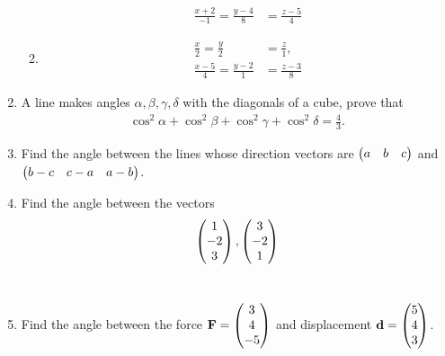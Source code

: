 \documentclass[journal,12pt,twocolumn]{IEEEtran}
\renewcommand\thesection{\arabic{section}}
\begin{document}
\begin{enumerate}[label=\thesection.\arabic*.,ref=\thesection.\theenumi]
\begin{enumerate}
\begin{align}
\frac{x+2}{-1} = \frac{y-4}{8} &= \frac{z-5}{4} 
\end{align}
\item 
\begin{align}
\frac{x}{2} = \frac{y}{2} &= \frac{z}{1}, 
\\
\frac{x-5}{4} = \frac{y-2}{1} &= \frac{z-3}{8} 
\end{align}
\end{enumerate}
\solution
%
\item A line makes angles $\alpha, \beta, \gamma, \delta$ with the diagonals of a cube, prove that \begin{align}
\cos^2\alpha + \cos^2\beta + \cos^2\gamma +\cos^2\delta = \frac{4}{3}.
\end{align}
\item Find the angle between the lines whose direction vectors are $\begin{pmatrix}a& b &c\end{pmatrix}$ and $\begin{pmatrix}b-c& c-a& a-b\end{pmatrix}$.
\item Find the angle between the vectors 
\begin{align}
\begin{pmatrix}1\\-2\\3\end{pmatrix},
\begin{pmatrix}3\\-2\\1\end{pmatrix}
\end{align}
\\
\solution 

\item Find the angle between the force $\mathbf{F} = \begin{pmatrix}3\\4\\-5\end{pmatrix}$ and displacement $\mathbf{d} = \begin{pmatrix}5\\4\\3\end{pmatrix}$.
%
\\
\solution 


\end{enumerate}
\end{document}
